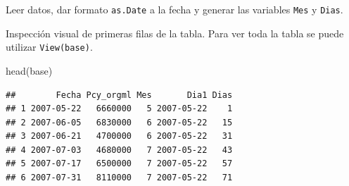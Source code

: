 \documentclass[
]{book}
\newenvironment{Shaded}{\begin{snugshade}}{\end{snugshade}}
\newcommand{\CommentTok}[1]{\textcolor[rgb]{0.56,0.35,0.01}{\textit{#1}}}
\newcommand{\DecValTok}[1]{\textcolor[rgb]{0.00,0.00,0.81}{#1}}
\newcommand{\FunctionTok}[1]{\textcolor[rgb]{0.00,0.00,0.00}{#1}}
\newcommand{\NormalTok}[1]{#1}
\newcommand{\OtherTok}[1]{\textcolor[rgb]{0.56,0.35,0.01}{#1}}
\newcommand{\SpecialCharTok}[1]{\textcolor[rgb]{0.00,0.00,0.00}{#1}}
\newcommand{\StringTok}[1]{\textcolor[rgb]{0.31,0.60,0.02}{#1}}
\begin{document}
Leer datos, dar formato \texttt{as.Date} a la fecha y generar las variables \texttt{Mes} y \texttt{Dias}.

\begin{Shaded}
\end{Shaded}

Inspección visual de primeras filas de la tabla. Para ver toda la tabla se puede utilizar \texttt{View(base)}.

\begin{Shaded}
\begin{Highlighting}[]
\FunctionTok{head}\NormalTok{(base)}
\end{Highlighting}
\end{Shaded}

\begin{verbatim}
##        Fecha Pcy_orgml Mes       Dia1 Dias
## 1 2007-05-22   6660000   5 2007-05-22    1
## 2 2007-06-05   6830000   6 2007-05-22   15
## 3 2007-06-21   4700000   6 2007-05-22   31
## 4 2007-07-03   4680000   7 2007-05-22   43
## 5 2007-07-17   6500000   7 2007-05-22   57
## 6 2007-07-31   8110000   7 2007-05-22   71
\end{verbatim}
\end{document}
